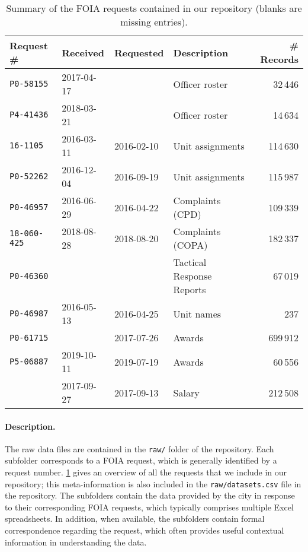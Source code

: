 \begin{table}[h]
	\begin{center}
\caption{Summary of the FOIA requests contained in our repository (blanks are missing entries).}
\vspace{0.5em}
\label{table:summary}
\begin{tabular}{@{}llllr@{}}
	\toprule
	Request \#&Received&Requested&Description& \# Records\\
\midrule
	\texttt{P0-58155}&2017-04-17& &Officer roster& 32\,446\\
	\texttt{P4-41436}&2018-03-21& &Officer roster& 14\,634\\
	\texttt{16-1105}&2016-03-11&2016-02-10&Unit assignments&114\,630\\
	\texttt{P0-52262}&2016-12-04&2016-09-19&Unit assignments&115\,987\\
	\texttt{P0-46957}&2016-06-29&2016-04-22&Complaints (CPD)&109\,339\\
	\texttt{18-060-425}&2018-08-28&2018-08-20&Complaints (COPA)&182\,337\\
	\texttt{P0-46360}& & &Tactical Response Reports&67\,019\\
	\texttt{P0-46987}&2016-05-13&2016-04-25&Unit names&237\\
	\texttt{P0-61715}& &2017-07-26&Awards&699\,912\\
	\texttt{P5-06887}&2019-10-11&2019-07-19&Awards&60\,556\\
					 &2017-09-27&2017-09-13&Salary&212\,508\\
\bottomrule
\end{tabular}
\end{center}
\end{table}

\paragraph{Description.}
The raw data files are contained in the \texttt{raw/} folder of the repository.
Each subfolder corresponds to a FOIA request, which is generally identified by
a request number. \cref{table:summary} gives an overview of all the requests
that we include in our repository; this meta-information is also included in
the \texttt{raw/datasets.csv} file in the repository. The subfolders contain
the data provided by the city in response to their corresponding FOIA requests,
which typically comprises multiple Excel spreadsheets. In addition, when
available, the subfolders contain formal correspondence regarding the request,
which often provides useful contextual information in understanding the data.  

